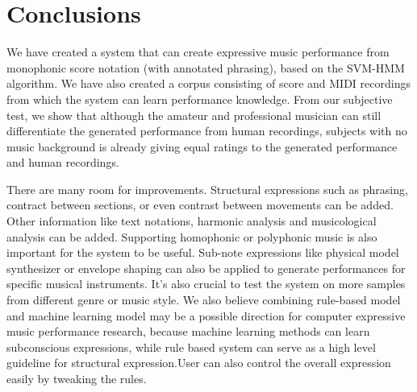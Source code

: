 \chapter{Conclusions}
We have created a system that can create expressive music performance from monophonic score notation (with annotated phrasing), based on the SVM-HMM algorithm. We have also created a corpus consisting of score and MIDI recordings from which the system can learn performance knowledge. From our subjective test, we show that although the amateur and professional musician can still differentiate the generated performance from human recordings, subjects with no music background is already giving equal ratings to the generated performance and human recordings.

There are many room for improvements. Structural expressions such as phrasing, contract between sections, or even contrast between movements can be added. Other information like text notations, harmonic analysis and musicological analysis can be added. Supporting homophonic or polyphonic music is also important for the system to be useful. Sub-note expressions like physical model synthesizer or envelope shaping can also be applied to generate performances for specific musical instruments.  It's also crucial to test the system on more samples from different genre or music style. We also believe combining rule-based model and machine learning model may be a possible direction for computer expressive music performance research, because machine learning methods can learn subconscious expressions, while rule based system can serve as a high level guideline for structural expression.User can also control the overall expression easily by tweaking the rules.


